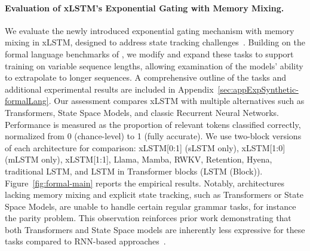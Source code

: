 \paragraph{Evaluation of xLSTM's Exponential Gating with Memory Mixing.} We evaluate the newly introduced exponential gating mechanism with memory mixing in xLSTM, designed to address state tracking challenges~\citep{Merrill:24, Merrill:23}. Building on the formal language benchmarks of \citet{Deletang:23}, we modify and expand these tasks to support training on variable sequence lengths, allowing examination of the models' ability to extrapolate to longer sequences. A comprehensive outline of the tasks and additional experimental results are included in Appendix~\ref{sec:appExpSynthetic-formalLang}.  
Our assessment compares xLSTM with multiple alternatives such as Transformers, State Space Models, and classic Recurrent Neural Networks. Performance is measured as the proportion of relevant tokens classified correctly, normalized from 0 (chance-level) to 1 (fully accurate). We use two-block versions of each architecture for comparison: xLSTM[0:1] (sLSTM only), xLSTM[1:0] (mLSTM only), xLSTM[1:1], Llama, Mamba, RWKV, Retention, Hyena, traditional LSTM, and LSTM in Transformer blocks (LSTM (Block)). Figure~\ref{fig:formal-main} reports the empirical results.  
Notably, architectures lacking memory mixing and explicit state tracking, such as Transformers or State Space Models, are unable to handle certain regular grammar tasks, for instance the parity problem. This observation reinforces prior work demonstrating that both Transformers and State Space models are inherently less expressive for these tasks compared to RNN-based approaches~\citep{Merrill:24, Merrill:23, Deletang:23}.

